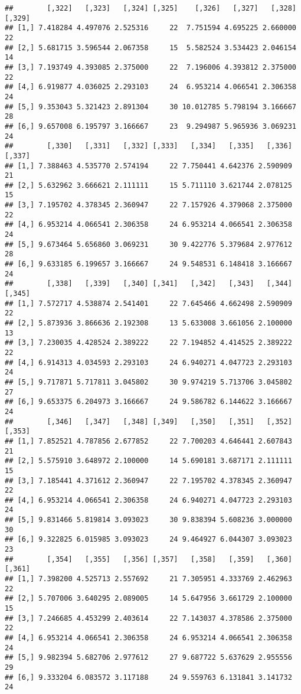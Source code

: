\documentclass[]{article}
\begin{document}
\begin{verbatim}
##        [,322]   [,323]   [,324] [,325]    [,326]   [,327]   [,328] [,329]
## [1,] 7.418284 4.497076 2.525316     22  7.751594 4.695225 2.660000     22
## [2,] 5.681715 3.596544 2.067358     15  5.582524 3.534423 2.046154     14
## [3,] 7.193749 4.393085 2.375000     22  7.196006 4.393812 2.375000     22
## [4,] 6.919877 4.036025 2.293103     24  6.953214 4.066541 2.306358     24
## [5,] 9.353043 5.321423 2.891304     30 10.012785 5.798194 3.166667     28
## [6,] 9.657008 6.195797 3.166667     23  9.294987 5.965936 3.069231     24
##        [,330]   [,331]   [,332] [,333]   [,334]   [,335]   [,336] [,337]
## [1,] 7.388463 4.535770 2.574194     22 7.750441 4.642376 2.590909     21
## [2,] 5.632962 3.666621 2.111111     15 5.711110 3.621744 2.078125     15
## [3,] 7.195702 4.378345 2.360947     22 7.157926 4.379068 2.375000     22
## [4,] 6.953214 4.066541 2.306358     24 6.953214 4.066541 2.306358     24
## [5,] 9.673464 5.656860 3.069231     30 9.422776 5.379684 2.977612     28
## [6,] 9.633185 6.199657 3.166667     24 9.548531 6.148418 3.166667     24
##        [,338]   [,339]   [,340] [,341]   [,342]   [,343]   [,344] [,345]
## [1,] 7.572717 4.538874 2.541401     22 7.645466 4.662498 2.590909     22
## [2,] 5.873936 3.866636 2.192308     13 5.633008 3.661056 2.100000     13
## [3,] 7.230035 4.428524 2.389222     22 7.194852 4.414525 2.389222     22
## [4,] 6.914313 4.034593 2.293103     24 6.940271 4.047723 2.293103     24
## [5,] 9.717871 5.717811 3.045802     30 9.974219 5.713706 3.045802     27
## [6,] 9.653375 6.204973 3.166667     24 9.586782 6.144622 3.166667     24
##        [,346]   [,347]   [,348] [,349]   [,350]   [,351]   [,352] [,353]
## [1,] 7.852521 4.787856 2.677852     22 7.700203 4.646441 2.607843     21
## [2,] 5.575910 3.648972 2.100000     14 5.690181 3.687171 2.111111     15
## [3,] 7.185441 4.371612 2.360947     22 7.195702 4.378345 2.360947     22
## [4,] 6.953214 4.066541 2.306358     24 6.940271 4.047723 2.293103     24
## [5,] 9.831466 5.819814 3.093023     30 9.838394 5.608236 3.000000     30
## [6,] 9.322825 6.015985 3.093023     24 9.464927 6.044307 3.093023     23
##        [,354]   [,355]   [,356] [,357]   [,358]   [,359]   [,360] [,361]
## [1,] 7.398200 4.525713 2.557692     21 7.305951 4.333769 2.462963     22
## [2,] 5.707006 3.640295 2.089005     14 5.647956 3.661729 2.100000     15
## [3,] 7.246685 4.453299 2.403614     22 7.143037 4.378586 2.375000     22
## [4,] 6.953214 4.066541 2.306358     24 6.953214 4.066541 2.306358     24
## [5,] 9.982394 5.682706 2.977612     27 9.687722 5.637629 2.955556     29
## [6,] 9.333204 6.083572 3.117188     24 9.559763 6.131841 3.141732     24

\end{verbatim}
\end{document}
